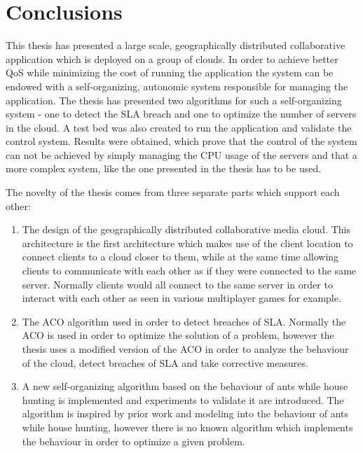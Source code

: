 \chapter{Conclusions} %
\label{Chapter6}

This thesis has presented a large scale, geographically distributed collaborative application which is deployed on a group of clouds. In order to achieve better QoS while minimizing the cost of running the application the system can be endowed with a self-organizing, autonomic system responsible for managing the application. The thesis has presented two algorithms for such a self-organizing system - one to detect the SLA breach and one to optimize the number of servers in the cloud. A test bed was also created to run the application and validate the control system. Results were obtained, which prove that the control of the system can not be achieved by simply managing the CPU usage of the servers and that a more complex system, like the one presented in the thesis has to be used.

The novelty of the thesis comes from three separate parts which support each other:

\begin{enumerate}
	\item The design of the geographically distributed collaborative media cloud. This architecture is the first architecture which makes use of the client location to connect clients to a cloud closer to them, while at the same time allowing clients to communicate with each other as if they were connected to the same server. Normally clients would all connect to the same server in order to interact with each other as seen in various multiplayer games for example.
	\item The ACO algorithm used in order to detect breaches of SLA. Normally the ACO is used in order to optimize the solution of a problem, however the thesis uses a modified version of the ACO in order to analyze the behaviour of the cloud, detect breaches of SLA and take corrective measures.
	\item A new self-organizing algorithm based on the behaviour of ants while house hunting is implemented and experiments to validate it are introduced. The algorithm is inspired by prior work and modeling into the behaviour of ants while house hunting, however there is no known algorithm which implements the behaviour in order to optimize a given problem.
\end{enumerate}

